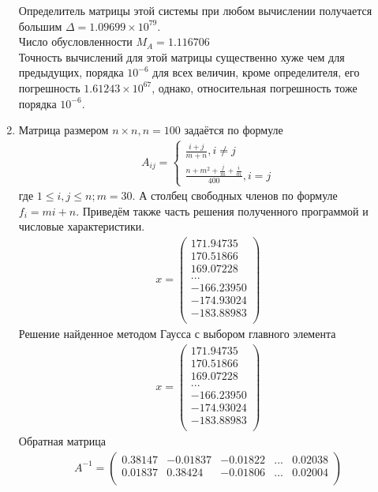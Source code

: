 \documentclass[a4paper,12pt,titlepage,finall]{article}
\begin{document}
\begin{enumerate}
Определитель матрицы этой системы при любом вычислении получается большим $\Delta = 1.09699 \times 10^{79}$.\\
Число обусловленности $M_A = 1.116706$\\
Точность вычислений для этой матрицы существенно хуже чем для предыдущих, порядка $10^{-6}$ для всех величин, кроме определителя, его погрешность $1.61243 \times 10^{67}$, однако, относительная погрешность тоже порядка $10^{-6}$.
\item
Матрица размером $n \times n, n = 100$ задаётся по формуле
\begin{align}
A_{ij} = \left\{
\begin{array}{ll}
\frac{i+j}{m+n}, i \neq j\\
\frac{n + m^2 + \frac{j}{m} + \frac{i}{m}}{400}, i = j
\end{array}
\right.
\end{align}
где $1 \leq i,j \leq n; m = 30$. А столбец свободных членов по формуле $f_i = mi + n$. Приведём также часть решения полученного программой и числовые характеристики.
\begin{align*}
x = \begin{pmatrix}
171.94735 \\
 170.51866 \\
 169.07228 \\
   ...\\
-166.23950 \\
-174.93024 \\
-183.88983 \\
\end{pmatrix}
\end{align*}
Решение найденное методом Гаусса с выбором главного элемента
\begin{align*}
x = \begin{pmatrix}
171.94735 \\
 170.51866 \\
 169.07228 \\
   ...\\
-166.23950 \\
-174.93024 \\
-183.88983 \\
\end{pmatrix}
\end{align*}
Обратная матрица
\begin{align*}
A^{-1} = \begin{pmatrix}
    0.38147&    -0.01837&    -0.01822& ... &     0.02038 \\
	0.01837&     0.38424&    -0.01806& ... &     0.02004 \\

\end{pmatrix}
\end{align*}
\end{enumerate}
\end{document}

